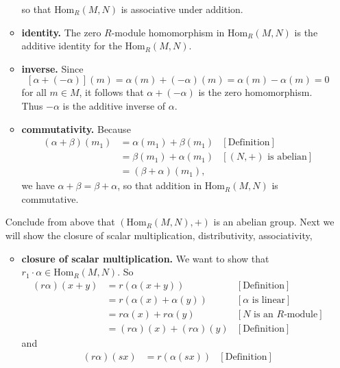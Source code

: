 \documentclass[9pt]{article}
\begin{document}
\begin{enumerate}
\begin{itemize}
               so that $\text{Hom}_R(M, N)$ is associative under addition.
         \item \textbf{identity.} The zero $R$-module homomorphism in
               $\text{Hom}_R(M, N)$ is the additive identity for the
               $\text{Hom}_R(M, N)$.
         \item \textbf{inverse.} Since
               $$[\alpha + (-\alpha)](m) = \alpha(m) + (-\alpha)(m) =
                 \alpha(m) - \alpha(m) = 0$$
               for all $m \in M$, it follows that $\alpha + (-\alpha)$ is the
               zero homomorphism. Thus $-\alpha$ is the additive inverse of
               $\alpha$.
         \item \textbf{commutativity.} Because
               \begin{align*}
                  (\alpha+\beta)(m_1) &= \alpha(m_1) + \beta(m_1)
                     &[\text{Definition}] \\
                     &= \beta(m_1) + \alpha(m_1) &[(N, +) \text{ is abelian}] \\
                     &= (\beta+\alpha)(m_1),
               \end{align*}
               we have $\alpha + \beta = \beta + \alpha$, so that addition in
               $\text{Hom}_R(M, N)$ is commutative.
      \end{itemize}
      Conclude from above that $(\text{Hom}_R(M, N), +)$ is an abelian group.
      Next we will show the closure of scalar multiplication, distributivity,
      associativity,
      \begin{itemize}
         \item \textbf{closure of scalar multiplication.} We want to show that
               $r_1 \cdot \alpha \in \text{Hom}_R(M, N)$. So 
               \begin{align*}
                  (r\alpha)(x + y) &= r (\alpha(x + y)) &[\text{Definition}] \\
                     &= r(\alpha(x) + \alpha(y)) &[\alpha \text{ is linear}] \\
                     &= r\alpha(x) + r\alpha(y)
                        &[N \text{ is an } R\text{-module}] \\
                     &= (r\alpha)(x) + (r\alpha)(y) &[\text{Definition}]
               \end{align*}
               and
               \begin{align*}
                  (r\alpha)(sx) &= r (\alpha(sx)) &[\text{Definition}] \\

\end{align*}
\end{itemize}
\end{enumerate}
\end{document}
